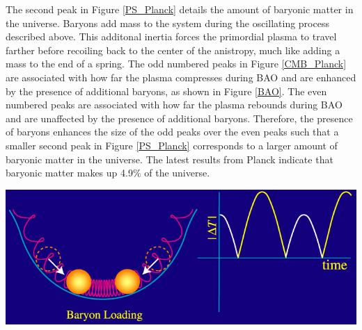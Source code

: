 \documentclass[a4paper,12pt]{article}
\begin{document}
The second peak in Figure \ref{PS_Planck} details the amount of baryonic matter in the universe.  Baryons add mass to the system during the oscillating process described above.  This additonal inertia forces the primordial plasma to travel farther before recoiling back to the center of the anistropy, much like adding a mass to the end of a spring.  The odd numbered peaks in Figure \ref{CMB_Planck} are associated with how far the plasma compresses during BAO and are enhanced by the presence of additional baryons, as shown in Figure \ref{BAO}.  The even numbered peaks are associated with how far the plasma rebounds during BAO and are unaffected by the presence of additional baryons.  Therefore, the presence of baryons enhances the size of the odd peaks over the even peaks such that a smaller second peak in Figure \ref{PS_Planck} corresponds to a larger amount of baryonic matter in the universe.  The latest results from Planck indicate that baryonic matter makes up 4.9\% of the universe.


\begin{center} \label{BAO}
\includegraphics[scale=0.7]{BAO.png}
\end{center} 
\end{document}
